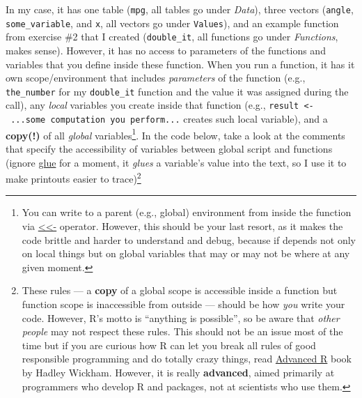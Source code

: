\documentclass[
]{book}
\begin{document}
In my case, it has one table (\texttt{mpg}, all tables go under \emph{Data}), three vectors (\texttt{angle}, \texttt{some\_variable}, and \texttt{x}, all vectors go under \texttt{Values}), and an example function from exercise \#2 that I created (\texttt{double\_it}, all functions go under \emph{Functions}, makes sense). However, it has no access to parameters of the functions and variables that you define inside these function. When you run a function, it has it own scope/environment that includes \emph{parameters} of the function (e.g., \texttt{the\_number} for my \texttt{double\_it} function and the value it was assigned during the call), any \emph{local} variables you create inside that function (e.g., \texttt{result\ \textless{}-\ ...some\ computation\ you\ perform...} creates such local variable), and a \textbf{copy(!)} of all \emph{global} variables\footnote{You can write to a parent (e.g., global) environment from inside the function via \href{https://stat.ethz.ch/R-manual/R-devel/library/base/html/assignOps.html}{\textless\textless-} operator. However, this should be your last resort, as it makes the code brittle and harder to understand and debug, because if depends not only on local things but on global variables that may or may not be where at any given moment.}. In the code below, take a look at the comments that specify the accessibility of variables between global script and functions (ignore \href{https://glue.tidyverse.org/reference/glue.html}{glue} for a moment, it \emph{glues} a variable's value into the text, so I use it to make printouts easier to trace)\footnote{These rules --- a \textbf{copy} of a global scope is accessible inside a function but function scope is inaccessible from outside --- should be how \emph{you} write your code. However, R's motto is ``anything is possible'', so be aware that \emph{other people} may not respect these rules. This should not be an issue most of the time but if you are curious how R can let you break all rules of good responsible programming and do totally crazy things, read \href{https://adv-r.hadley.nz/}{Advanced R} book by Hadley Wickham. However, it is really \textbf{advanced}, aimed primarily at programmers who develop R and packages, not at scientists who use them.}
\end{document}

